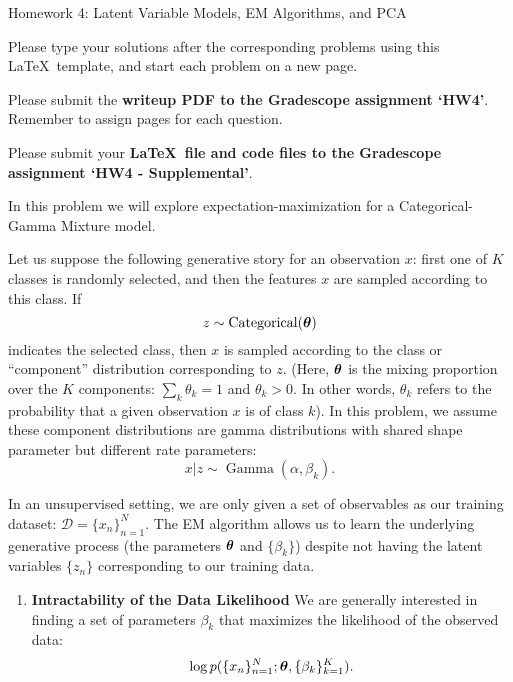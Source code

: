 \documentclass[submit]{harvardml}
\begin{document}
\begin{center}
{\Large Homework 4: Latent Variable Models, EM Algorithms, and PCA}\\
\end{center}

Please type your solutions after the corresponding problems using this
\LaTeX\ template, and start each problem on a new page.

Please submit the \textbf{writeup PDF to the Gradescope assignment `HW4'}. Remember to assign pages for each question.

Please submit your \textbf{\LaTeX\ file and code files to the Gradescope assignment `HW4 - Supplemental'}. 


\newpage
\begin{problem}

In this problem we will explore expectation-maximization for a Categorical-Gamma Mixture model.

Let us suppose the following generative story for an observation $x$: first one of $K$ classes is randomly selected, and then the features $x$ are sampled according to this class. If $$z \sim \operatorname{Categorical}(\boldsymbol{\theta})$$ indicates the selected class, then $x$ is sampled according to the class or ``component'' distribution corresponding to $z$. (Here, $\boldsymbol{\theta}$ is the mixing proportion over the $K$ components: $\sum_k \theta_k = 1$ and $ \theta_k > 0$. In other words, $\theta_k$ refers to the probability that a given observation $x$ is of class $k$). In this problem, we assume these component distributions are gamma distributions with shared shape parameter but different rate parameters: $$x | z \sim \operatorname{Gamma}(\alpha, \beta_k).$$

In an unsupervised setting, we are only given a set of observables as our training dataset: $\mathcal D = \{x_n\}_{n=1}^N$. The EM algorithm allows us to learn the underlying generative process (the parameters $\boldsymbol{\theta}$ and $\{\beta_k\}$) despite not having the latent variables $\{z_n\}$ corresponding to our training data.

\vspace{2em}

\begin{enumerate}

  \item \textbf{Intractability of the Data Likelihood} We are
    generally interested in finding a set of parameters $\beta_k$ that
    maximizes the likelihood of the observed data: $$\log
    p(\{x_n\}^N_{n=1}; \boldsymbol{\theta}, \{\beta_k\}^K_{k = 1}).$$ 
    

\end{enumerate}
\end{problem}
\end{document}
